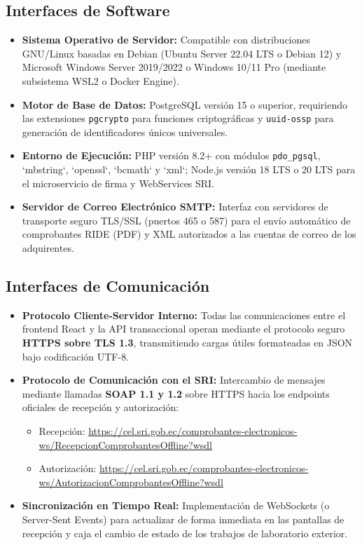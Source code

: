 \documentclass[12pt,a4paper]{report}
\begin{document}
\subsection{Interfaces de Software}
\begin{itemize}
    \item \textbf{Sistema Operativo de Servidor:} Compatible con distribuciones GNU/Linux basadas en Debian (Ubuntu Server 22.04 LTS o Debian 12) y Microsoft Windows Server 2019/2022 o Windows 10/11 Pro (mediante subsistema WSL2 o Docker Engine).
    \item \textbf{Motor de Base de Datos:} PostgreSQL versión 15 o superior, requiriendo las extensiones \texttt{pgcrypto} para funciones criptográficas y \texttt{uuid-ossp} para generación de identificadores únicos universales.
    \item \textbf{Entorno de Ejecución:} PHP versión 8.2+ con módulos \texttt{pdo\_pgsql}, `mbstring`, `openssl`, `bcmath` y `xml`; Node.js versión 18 LTS o 20 LTS para el microservicio de firma y WebServices SRI.
    \item \textbf{Servidor de Correo Electrónico SMTP:} Interfaz con servidores de transporte seguro TLS/SSL (puertos 465 o 587) para el envío automático de comprobantes RIDE (PDF) y XML autorizados a las cuentas de correo de los adquirentes.
\end{itemize}

\subsection{Interfaces de Comunicación}
\begin{itemize}
    \item \textbf{Protocolo Cliente-Servidor Interno:} Todas las comunicaciones entre el frontend React y la API transaccional operan mediante el protocolo seguro \textbf{HTTPS sobre TLS 1.3}, transmitiendo cargas útiles formateadas en JSON bajo codificación UTF-8.
    \item \textbf{Protocolo de Comunicación con el SRI:} Intercambio de mensajes mediante llamadas \textbf{SOAP 1.1 y 1.2} sobre HTTPS hacia los endpoints oficiales de recepción y autorización:
        \begin{itemize}
            \item Recepción: \url{https://cel.sri.gob.ec/comprobantes-electronicos-ws/RecepcionComprobantesOffline?wsdl}
            \item Autorización: \url{https://cel.sri.gob.ec/comprobantes-electronicos-ws/AutorizacionComprobantesOffline?wsdl}
        \end{itemize}
    \item \textbf{Sincronización en Tiempo Real:} Implementación de WebSockets (o Server-Sent Events) para actualizar de forma inmediata en las pantallas de recepción y caja el cambio de estado de los trabajos de laboratorio exterior.
\end{itemize}
\end{document}
